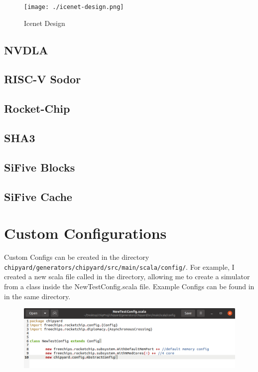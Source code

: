 \begin{figure}[h!tbp]
  \centering
  \texttt{[image: ./icenet-design.png]}
  \caption{Icenet Design}
  \label{fig:Icenet_Generator}
\end{figure}

\subsection{NVDLA}\label{sec:NVDLA_Generator}
\subsection{RISC-V Sodor}\label{sec:RISC-V_Sodor}
\subsection{Rocket-Chip}\label{sec:Rocket_Chip}
\nocite{rocketChipPaper}

\subsection{SHA3}\label{sec:SHA3_Accelerators_Generator}
\subsection{SiFive Blocks}\label{sec:SiFive_Blocks}
\subsection{SiFive Cache}\label{sec:SiFive_Cache}
\subsection{}\label{sec:testchipip}

\section{Custom Configurations}\label{sec:Custom_Configurations}
Custom Configs can be created in the directory \texttt{chipyard/generators/chipyard/src/main/scala/config/}.
For example, I created a new scala file called  in the directory, allowing me to create a simulator from a class inside the NewTestConfig.scala file.
Example Configs can be found in   in the same directory.

\begin{figure}[h!tbp]
  \centering
  \includegraphics[width=0.7\linewidth]{./NewTestConfig.png}
  \caption{}
  \label{fig:newtestconfig}
\end{figure}

